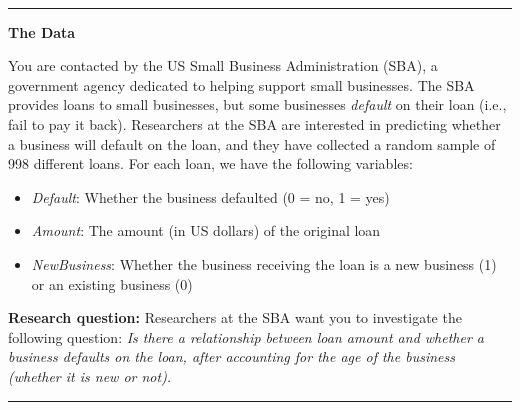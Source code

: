 \documentclass[11pt]{article}
\begin{document}
\begin{titlepage}



\end{titlepage}

\pagebreak

$\:$ \\
\thispagestyle{empty}
\pagebreak

\setcounter{page}{1}

\rule{\textwidth}{0.5pt}

\textbf{The Data} 

You are contacted by the US Small Business Administration (SBA), a government agency dedicated to helping support small businesses. The SBA provides loans to small businesses, but some businesses \textit{default} on their loan (i.e., fail to pay it back). Researchers at the SBA are interested in predicting whether a business will default on the loan, and they have collected a random sample of 998 different loans. For each loan, we have the following variables:

\begin{itemize}
\item \textit{Default}: Whether the business defaulted (0 = no, 1 = yes)
\item \textit{Amount}: The amount (in US dollars) of the original loan
\item \textit{NewBusiness}: Whether the business receiving the loan is a new business (1) or an existing business (0)
\end{itemize}

\textbf{Research question:} Researchers at the SBA want you to investigate the following question: \textit{Is there a relationship between loan amount and whether a business defaults on the loan, after accounting for the age of the business (whether it is new or not).}

\rule{\textwidth}{1pt}
\end{document}
